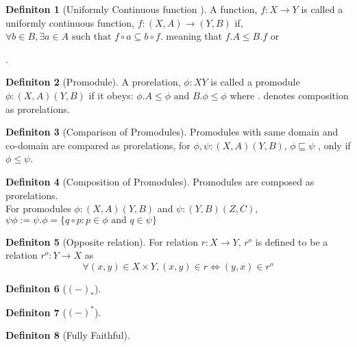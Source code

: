 \documentclass[18pt,a4paper]{article}
\makeatletter
\theoremstyle{definition}
\newtheorem{definition}{Definiton}[section]
\newcommand\cen[2][\leq]{\arrow[mysymbol]{#2}[description]{#1}}
\newcommand{\carrow}{}%
\DeclareRobustCommand{\carrow}{%
  \mathrel{\vphantom{\rightarrow}\mathpalette\circle@arrow\relax}%
}
\newcommand{\circle@arrow}[2]{%
  \m@th
  \ooalign{%
    \hidewidth$#1\circ\mkern1mu$\hidewidth\cr
    $#1\longrightarrow$\cr}%
}
\makeatother
\begin{document}
\begin{definition}[Uniformly Continuous function ] %
	A function, $f:X \to Y$ is called a uniformly continuous function, $f:(X,A) \to (Y,B)$
	if, $\forall b \in B, \exists a \in A \text{ such that } f \circ a \subseteq b \circ f $.
	meaning that $f.A \leq B.f$ or
	.

\end{definition}
\begin{definition}[Promodule] %
	A prorelation, $\phi:X \carrow Y$ is called a promodule $\phi: (X,A) \carrow (Y,B)$  if it obeys:
	$ \phi.A \leq \phi \text{ and } B. \phi \leq \phi $ where . denotes composition as prorelations.
\end{definition}
\begin{definition}[Comparison of Promodules] %
	Promodules with same domain and co-domain are compared as prorelations, for
	$\phi,\psi:(X,A)\carrow (Y,B)$, $\phi \sqsubseteq \psi$ , only if $\phi \leq \psi$.
\end{definition}
\begin{definition}[Composition of Promodules] %
	Promodules are composed as prorelations.\\
	For promodules $\phi: (X,A) \carrow (Y,B)$ and $\psi:(Y,B)\carrow(Z,C)$,
	$\psi \phi := \psi.\phi = \{q \circ p :p\in \phi \text{ and } q \in \psi \}$
\end{definition}
\begin{definition}[Opposite relation] %
For relation $r:X \to Y$, $r^o$ is defined to be a relation $r^o:Y \to X$ as
\[ \forall (x,y)\in X \times Y, (x,y)\in r \iff (y,x) \in r^o \]
\end{definition}
\begin{definition}[$(-)_*$] %

\end{definition}
\begin{definition}[$(-)^*$] %

\end{definition}
\begin{definition}[Fully Faithful] %

\end{definition}
\end{document}
